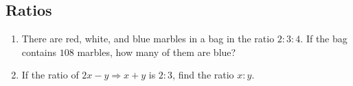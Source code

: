 \documentclass{article}
\begin{document}
\subsection*{Ratios}
    \begin{enumerate}[resume]
        \item There are red, white, and blue marbles in a bag in the ratio $2 : 3 : 4$.
            If the bag contains $108$ marbles, how many of them are blue?
            \vspace{3cm}
        \item If the ratio of $2x - y \Rightarrow x + y$ is $2 : 3$, find the ratio $x : y$.
            \vspace{3cm}
    \end{enumerate}
\end{document}
